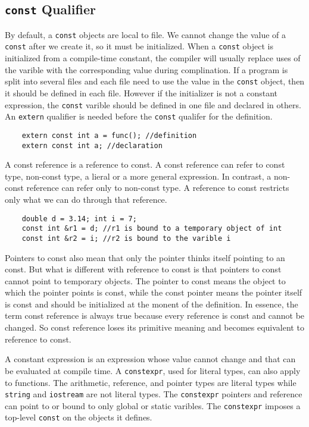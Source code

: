 \documentclass[11pt]{ctexart}
\begin{document}
\subsection{\texttt{const} Qualifier}
By default, a \verb|const| objects are local to file. We cannot change the value of a \verb|const| after we create it, so it must be initialized. When a \verb|const| object is initialized from a compile-time constant, the compiler will usually replace uses of the varible with the corresponding value during complination. If a program is split into several files and each file need to use the value in the \verb|const| object, then it should be defined in each file. However if the initializer is not a constant expression, the \verb|const| varible should be defined in one file and declared in others. An \verb|extern| qualifier is needed before the \verb|const| qualifer for the definition.\begin{lstlisting}
    extern const int a = func(); //definition
    extern const int a; //declaration
\end{lstlisting}\par
A const reference is a reference to const. A const reference can refer to const type, non-const type, a lieral or a more general expression. In contrast, a non-const reference can refer only to non-const type. A reference to const restricts only what we can do through that reference.
\begin{lstlisting}
    double d = 3.14; int i = 7;
    const int &r1 = d; //r1 is bound to a temporary object of int
    const int &r2 = i; //r2 is bound to the varible i
\end{lstlisting}\par
Pointers to const also mean that only the pointer thinks itself pointing to an const. But what is different with reference to const is that pointers to const cannot point to temporary objects. The pointer to const means the object to which the pointer points is const, while the const pointer means the pointer itself is const and should be initialized at the monent of the definition. In essence, the term const reference is always true because every reference is const and cannot be changed. So const reference loses its primitive meaning and becomes equivalent to reference to const.\par
A constant expression is an expression whose value cannot change and that can be evaluated at compile time. A \verb|constexpr|, used for literal types, can also apply to functions. The arithmetic, reference, and pointer types are literal types while \verb|string| and \verb|iostream| are not literal types. The \verb|constexpr| pointers and reference can point to or bound to only global or static varibles. The \verb|constexpr| imposes a top-level \verb|const| on the objects it defines.
\end{document}

